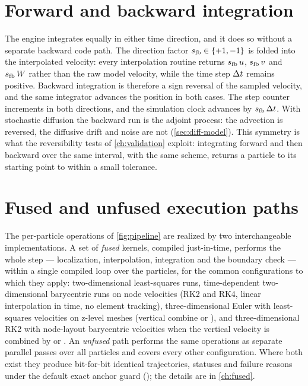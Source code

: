 
\section{Forward and backward integration}\label{sec:arch-direction}

The engine integrates equally in either time direction, and it does so without a
separate backward code path. The direction factor $s_{\mathrm{fb}}\in\{+1,-1\}$ is folded
into the interpolated velocity: every interpolation routine returns
$s_{\mathrm{fb}}\,u$, $s_{\mathrm{fb}}\,v$ and $s_{\mathrm{fb}}\,W$ rather than the raw model velocity, while
the time step $\Delta t$ remains positive. Backward integration is therefore a sign
reversal of the sampled velocity, and the same integrator advances the position in
both cases. The step counter increments in both directions, and the simulation
clock advances by $s_{\mathrm{fb}}\,\Delta t$. With stochastic diffusion the backward run is the adjoint process: the
advection is reversed, the diffusive drift and noise are not (\cref{sec:diff-model}). This symmetry is what the reversibility tests of
\cref{ch:validation} exploit: integrating forward and then backward over the same
interval, with the same scheme, returns a particle to its starting point to within
a small tolerance.

\section{Fused and unfused execution paths}\label{sec:arch-fused}

The per-particle operations of \cref{fig:pipeline} are realized by two interchangeable implementations. A set
of \emph{fused} kernels, compiled just-in-time, performs the whole step --- localization, interpolation,
integration and the boundary check --- within a single compiled loop over the particles, for the common
configurations to which they apply: two-dimensional least-squares runs, time-dependent two-dimensional
barycentric runs on node velocities (RK2 and RK4, linear interpolation in time, no element tracking), three-dimensional Euler with least-squares velocities on z-level meshes (vertical combine 
or ), and
three-dimensional RK2 with node-layout barycentric velocities when the vertical velocity is combined by
 or . An \emph{unfused} path performs the same operations as separate parallel
passes over all particles and covers every other configuration. Where both exist they produce bit-for-bit
identical trajectories, statuses and failure reasons under the default exact anchor guard
(); the details are in \cref{ch:fused}.
